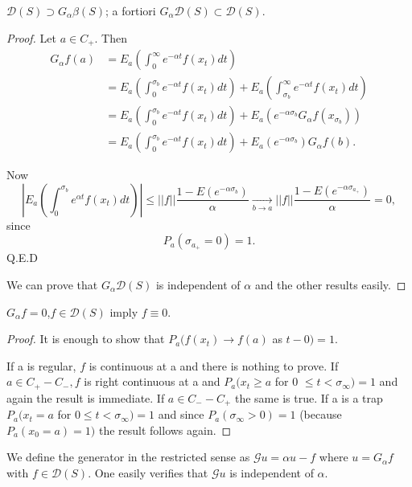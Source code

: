 \setcounter{thm}{0}
\begin{thm}\label{chap6-sec2-thm1}%
  $\mathscr{D}(S) \supset G_\alpha \beta (S)$; a fortiori $G_\alpha
  \mathscr{D} (S) \subset \mathscr{D}(S)$. 
\end{thm}

\begin{proof}
Let $a \in C_+$. Then 
\begin{align*}
G_\alpha f(a) &= E_a \left( \int ^\infty_0 e^{- \alpha t} f (x_t)dt\right)\\
&= E_a \left(\int^{\sigma _b}_0 e^{- \alpha t} f(x_t) dt\right) + E_a
\left(\int^{\infty}_{\sigma_b}e^{- \alpha t} f (x_t)dt\right)\\ 
& = E_a
    \left(\int^{\sigma_b}_0 e^{- \alpha t} f (x_t)dt \right) + E_a (e^{- \alpha
      \sigma_b} G_\alpha f(x_{\sigma_b}))\\ 
    &= E_a \left(\int^{\sigma_b}_0 e^{-\alpha t} f(x_t) dt\right) + E_a (e^{-
    \alpha \sigma_b}) G_\alpha f(b). 
  \end{align*}

  Now 
  $$
  | E_a \left(\int^{\sigma_b}_0 e^{\alpha t}
    f(x_t)dt\right)| \leq || f || 
    \frac{1-E(e^{- \alpha \sigma_b})}{\alpha} \xrightarrow[b \rightarrow
      a]{} ||f||  \frac{1-E(e^{- \alpha
        \sigma_{a_+}})}{\alpha}=0,
$$
since
$$
P_a(\sigma_{a_+}=0 )=1.
$$
Q.E.D


We can prove that $G_\alpha \mathscr{D}(S)$ is independent of $\alpha$
and the other results easily. 
\end{proof}

\begin{thm}\label{chap6-sec2-thm2}%
$G_\alpha f=0$,\pageoriginale $f \in \mathscr{D}(S)$ imply $f \equiv 0$.
\end{thm}

\begin{proof}
It is enough to show that $P_a(f(x_t) \rightarrow f(a)$ as $t - 0) = 1$.

If a is regular, $f$ is continuous at a and there is nothing to
prove. If $a \in C_+ - C_- , f$ is right continuous at a and $P_a (x_t
\geq a$ for 0 $\leq t < \sigma_\infty ) = 1$ and again the result is
immediate. If $a \in C_- - C_+$ the same is true. If a is a trap $P_a
(x_t=a$ for $0 \le t < \sigma_\infty ) = 1$ and since
$P_a(\sigma_\infty > 0)=1$ (because $P_a (x_0 =a )=1)$ the result
follows again. 
\end{proof}

\begin{defi*}
We define the generator in the restricted sense as $\mathscr{G}u =
\alpha u - f$ where $u = G_\alpha f$ with $f \in
\mathscr{D}(S)$. One easily verifies that $\mathscr{G} u$ is 
independent of $\alpha$. 
\end{defi*}

